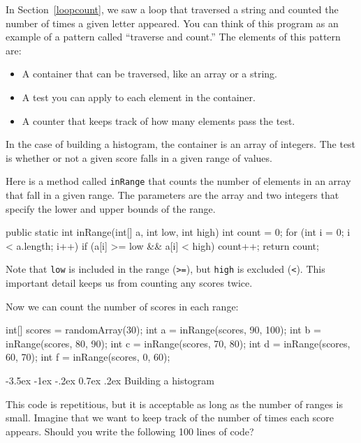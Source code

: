 \documentclass[12pt]{book}
\makeatletter
\theoremstyle{exercise}
\newcommand{\java}[1]{\verb"#1"}
\renewcommand{\section}{\@startsection{section}{1}{\z@}%
    {-3.5ex \@plus -1ex \@minus -.2ex}%
    {0.7ex \@plus.2ex}%
    {\normalfont\Large\bfseries}}
\newcommand{\java}[1]{\lstinline{#1}} %
\makeatother
\begin{document}
In Section~\ref{loopcount}, we saw a loop that traversed a string and counted the number of times a given letter appeared.
You can think of this program as an example of a pattern called ``traverse and count.''
The elements of this pattern are:

\begin{itemize}
\item A container that can be traversed, like an array or a string.
\item A test you can apply to each element in the container.
\item A counter that keeps track of how many elements pass the test.
\end{itemize}

In the case of building a histogram, the container is an array of integers.
The test is whether or not a given score falls in a given range of values.

Here is a method called \java{inRange} that counts the number of elements in an array that fall in a given range.
The parameters are the array and two integers that specify the lower and upper bounds of the range.

\begin{code}
public static int inRange(int[] a, int low, int high) {
    int count = 0;
    for (int i = 0; i < a.length; i++) {
        if (a[i] >= low && a[i] < high) {
            count++;
        }
    }
    return count;
}
\end{code}

Note that \java{low} is included in the range (\java{>=}), but \java{high} is excluded (\java{<}).
This important detail keeps us from counting any scores twice.

Now we can count the number of scores in each range:

\begin{code}
    int[] scores = randomArray(30);
    int a = inRange(scores, 90, 100);
    int b = inRange(scores, 80, 90);
    int c = inRange(scores, 70, 80);
    int d = inRange(scores, 60, 70);
    int f = inRange(scores, 0, 60);
\end{code}


\section{Building a histogram}

This code is repetitious, but it is acceptable as long as the number of ranges is small.
Imagine that we want to keep track of the number of times each score appears.
Should you write the following 100 lines of code?
\end{document}

